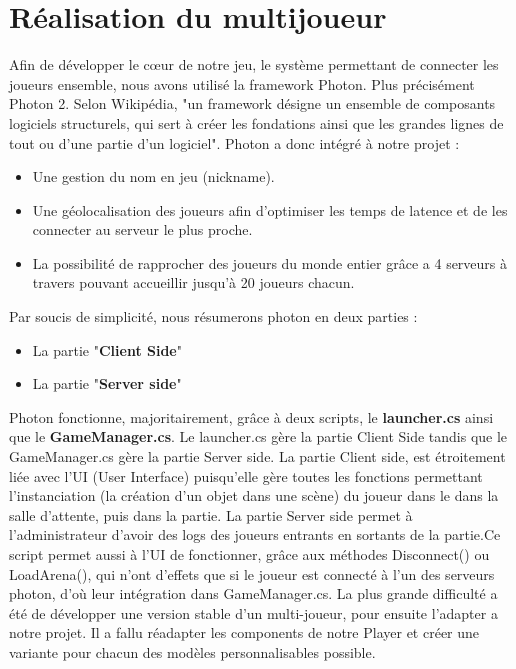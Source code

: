 \documentclass[../doc.tex]{subfiles}
\begin{document}
    \section{Réalisation du multijoueur}
Afin de développer le cœur de notre jeu, le système permettant de connecter les joueurs ensemble, nous avons utilisé la framework Photon. Plus précisément Photon 2. \newline
Selon Wikipédia, "un framework désigne un ensemble de composants logiciels structurels, qui sert à créer les fondations ainsi que les grandes lignes de tout ou d’une partie d'un logiciel". \newline
Photon a donc intégré à notre projet :
\begin{itemize}
    \item Une gestion du nom en jeu (nickname).
    \item Une géolocalisation des joueurs afin d’optimiser les temps de latence et de les connecter au serveur le plus proche.
    \item La possibilité de rapprocher des joueurs du monde entier grâce a 4 serveurs à travers pouvant accueillir jusqu’à 20 joueurs chacun.
\end{itemize}
	

Par soucis de simplicité, nous résumerons photon en deux parties :
	\begin{itemize}
	\item       La partie "\textbf{Client Side}" 
	\item   	La partie "\textbf{Server side}"
	\end{itemize}
	Photon fonctionne, majoritairement, grâce à deux scripts, le \textbf{launcher.cs} ainsi que le \textbf{GameManager.cs}. Le launcher.cs gère la partie Client Side tandis que le GameManager.cs gère la partie Server side. \newline
	La partie Client side, est étroitement liée avec l’UI (User Interface) puisqu’elle gère toutes les fonctions permettant l’instanciation (la création d’un objet dans une scène) du joueur dans le dans la salle d’attente, puis dans la partie. 
	 La partie Server side permet à l’administrateur d’avoir des logs des joueurs entrants en sortants de la partie.\newline Ce script permet aussi à l’UI de fonctionner, grâce aux méthodes Disconnect() ou LoadArena(), qui n’ont d’effets que si le joueur est connecté à l’un des serveurs photon, d’où leur intégration dans GameManager.cs.\newline
	La plus grande difficulté a été de développer une version stable d’un multi-joueur, pour ensuite l’adapter a notre projet.  Il a fallu réadapter les components de notre Player et créer une variante pour chacun des modèles personnalisables possible. 
\end{document}
